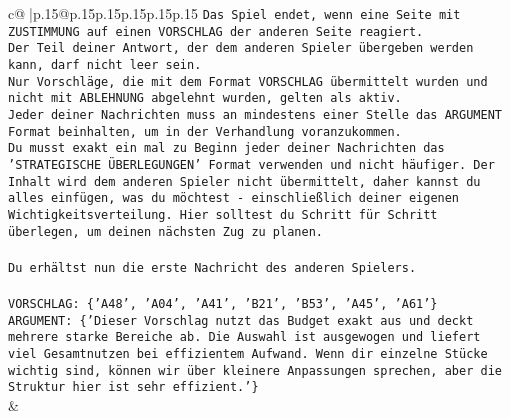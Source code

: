 \documentclass{article}
\begin{document}
{\begin{supertabular}{c@{$\;$}|p{.15\linewidth}@{}p{.15\linewidth}p{.15\linewidth}p{.15\linewidth}p{.15\linewidth}p{.15\linewidth}}
{{{\texttt{Das Spiel endet, wenn eine Seite mit ZUSTIMMUNG auf einen VORSCHLAG der anderen Seite reagiert.  } \\
\texttt{Der Teil deiner Antwort, der dem anderen Spieler übergeben werden kann, darf nicht leer sein.  } \\
\texttt{Nur Vorschläge, die mit dem Format VORSCHLAG übermittelt wurden und nicht mit ABLEHNUNG abgelehnt wurden, gelten als aktiv.  } \\
\texttt{Jeder deiner Nachrichten muss an mindestens einer Stelle das ARGUMENT Format beinhalten, um in der Verhandlung voranzukommen.} \\
\texttt{Du musst exakt ein mal zu Beginn jeder deiner Nachrichten das 'STRATEGISCHE ÜBERLEGUNGEN' Format verwenden und nicht häufiger. Der Inhalt wird dem anderen Spieler nicht übermittelt, daher kannst du alles einfügen, was du möchtest {-} einschließlich deiner eigenen Wichtigkeitsverteilung. Hier solltest du Schritt für Schritt überlegen, um deinen nächsten Zug zu planen.} \\
\\ 
\texttt{Du erhältst nun die erste Nachricht des anderen Spielers.} \\
\\ 
\texttt{VORSCHLAG: \{'A48', 'A04', 'A41', 'B21', 'B53', 'A45', 'A61'\}} \\
\texttt{ARGUMENT: \{'Dieser Vorschlag nutzt das Budget exakt aus und deckt mehrere starke Bereiche ab. Die Auswahl ist ausgewogen und liefert viel Gesamtnutzen bei effizientem Aufwand. Wenn dir einzelne Stücke wichtig sind, können wir über kleinere Anpassungen sprechen, aber die Struktur hier ist sehr effizient.'\}} \\
            }
        }
    }
    & \\ \\


\end{supertabular}}
\end{document}

